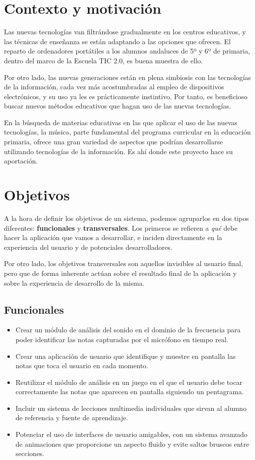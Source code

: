 \section{Contexto y motivación}
Las nuevas tecnologías van filtrándose gradualmente en los centros
educativos, y las técnicas de enseñanza se están adaptando a las
opciones que ofrecen. El reparto de ordenadores portátiles a los
alumnos andaluces de 5º y 6º de primaria, dentro del marco de la
Escuela TIC 2.0, es buena muestra de ello. 

Por otro lado, las nuevas generaciones están en plena simbiosis con
las tecnologías de la información, cada vez más acostumbradas al
empleo de dispositivos electrónicos, y su uso ya les es prácticamente
instintivo. Por tanto, es beneficioso buscar nuevos métodos educativos
que hagan uso de las nuevas tecnologías.

En la búsqueda de materias educativas en las que aplicar el uso de las
nuevas tecnologías, la música, parte fundamental del programa
curricular en la educación primaria, ofrece una gran variedad de
aspectos que podrían desarrollarse utilizando tecnologías de la
información. Es ahí donde este proyecto hace su aportación.

\section{Objetivos}
A la hora de definir los objetivos de un sistema, podemos agruparlos
en dos tipos diferentes: \textbf{funcionales} y
\textbf{transversales}. Los primeros se refieren a \textit{qué} debe
hacer la aplicación que vamos a desarrollar, e inciden
directamente en la experiencia del usuario y de potenciales
desarrolladores.

Por otro lado, los objetivos transversales son aquellos invisibles al
usuario final, pero que de forma inherente actúan sobre el resultado
final de la aplicación y sobre la experiencia de desarrollo de la misma.

\subsection{Funcionales}
\begin{itemize}
\item Crear un módulo de análisis del sonido en el dominio de la
  frecuencia para poder identificar las notas capturadas por el
  micrófono en tiempo real.
\item Crear una aplicación de usuario que identifique y muestre en
  pantalla las notas que toca el usuario en cada momento.
\item Reutilizar el módulo de análisis en un juego en el que el
  usuario debe tocar correctamente las notas que aparecen en pantalla
  siguiendo un pentagrama.
\item Incluir un sistema de lecciones multimedia individuales que
  sirvan al alumno de referencia y fuente de aprendizaje.
\item Potenciar el uso de interfaces de usuario amigables, con un
  sistema avanzado de animaciones que proporcione un aspecto fluido y
  evite saltos bruscos entre secciones.
\end{itemize}

